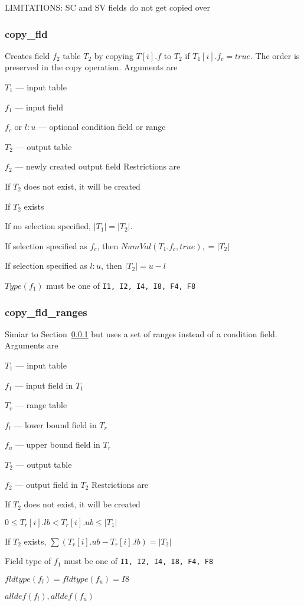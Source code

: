 \documentclass{report}
\begin{document}
LIMITATIONS: SC and SV fields do not get copied over


\subsubsection{copy\_fld}
\label{copy_fld}

Creates field \(f_2\) table \(T_2\) by copying
\(T[i].f\) to \(T_2\) if \(T_1[i].f_c = true\). The order is preserved
in the copy operation.
Arguments are
\be
\item \(T_1\) --- input table 
\item \(f_1\) --- input field 
\item \(f_c\) or \(l:u\) --- optional condition field or range 
\item \(T_2\) --- output table 
\item \(f_2\) --- newly created output field 
\ee
Restrictions are
\be
\item If \(T_2\) does not exist, it will be created
\item If \(T_2\) exists
\be
\item If no selection specified, \(|T_1| = |T_2|\). 
\item If selection specified as \(f_c\), then \(NumVal(T_1.f_c, true), = |T_2|\)
\item If selection specified as \(l:u\), then \(|T_2| = u - l\)
\ee
\item \(Type(f_1)\) must be one of {\tt I1, I2, I4, I8, F4, F8}
\ee

\subsubsection{copy\_fld\_ranges}
\label{copy_fld_ranges}

Simiar to Section~\ref{copy_fld} but uses a set of ranges instead of a 
condition field.  Arguments are
\be
\item \(T_1\) --- input table 
\item \(f_1\) --- input field in \(T_1\)
\item \(T_r\) --- range table 
\item \(f_l\) --- lower bound field in \(T_r\)
\item \(f_u\) --- upper bound field in \(T_r\)
\item \(T_2\) --- output table 
\item \(f_2\) --- output field in \(T_2\)
\ee
Restrictions are
\be
\item If \(T_2\) does not exist, it will be created
\item \(0 \leq T_r[i].lb < T_r[i].ub \leq |T_1| \)
\item If \(T_2\) exists, \(\sum (T_r[i].ub - T_r[i].lb) = |T_2|\)
\item Field type of \(f_1\) must be one of {\tt I1, I2, I4, I8, F4, F8}
\item \(fldtype(f_l) = fldtype(f_u) = I8\)
\item \(alldef(f_l), alldef(f_u)\)
\ee
\end{document}
